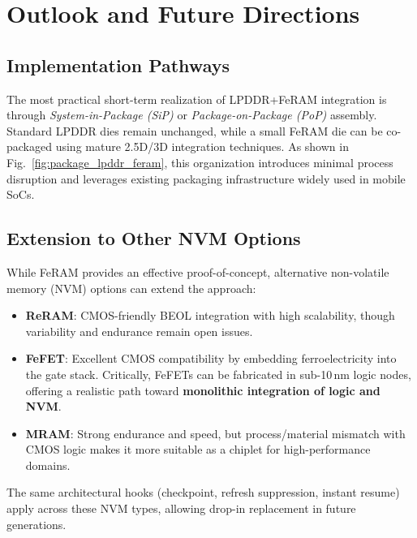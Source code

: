 \section{Outlook and Future Directions}

\subsection{Implementation Pathways}
The most practical short-term realization of LPDDR+FeRAM integration is through \emph{System-in-Package (SiP)} or \emph{Package-on-Package (PoP)} assembly. 
Standard LPDDR dies remain unchanged, while a small FeRAM die can be co-packaged using mature 2.5D/3D integration techniques.
As shown in Fig.~\ref{fig:package_lpddr_feram}, this organization introduces minimal process disruption and leverages existing packaging infrastructure widely used in mobile SoCs.

\subsection{Extension to Other NVM Options}
While FeRAM provides an effective proof-of-concept, alternative non-volatile memory (NVM) options can extend the approach:
\begin{itemize}
  \item \textbf{ReRAM}: CMOS-friendly BEOL integration with high scalability, though variability and endurance remain open issues.
  \item \textbf{FeFET}: Excellent CMOS compatibility by embedding ferroelectricity into the gate stack. 
  Critically, FeFETs can be fabricated in sub-10\,nm logic nodes, offering a realistic path toward \textbf{monolithic integration of logic and NVM}.
  \item \textbf{MRAM}: Strong endurance and speed, but process/material mismatch with CMOS logic makes it more suitable as a chiplet for high-performance domains.
\end{itemize}
The same architectural hooks (checkpoint, refresh suppression, instant resume) apply across these NVM types, allowing drop-in replacement in future generations.

